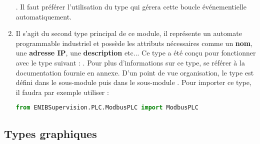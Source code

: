 \begin{enumerate}
. Il faut préférer l'utilisation du type  qui gérera cette boucle événementielle automatiquement.

\item \label{tag-presentation-ModbusPLC}  \newline
Il s'agit du second type principal de ce module, il représente un automate programmable industriel et possède les attributs nécessaires comme un \textbf{nom}, une \textbf{adresse IP}, une \textbf{description} etc... Ce type a été conçu pour fonctionner avec le type suivant : .\newline
Pour plus d'informations sur ce type, se référer à la documentation fournie en annexe.\newline
D'un point de vue organisation, le type  est défini dans le sous-module  puis dans le sous-module . \newline
Pour importer ce type, il faudra par exemple utiliser :
\begin{lstlisting}[language=Python]
from ENIBSupervision.PLC.ModbusPLC import ModbusPLC
\end{lstlisting}

\end{enumerate}



\newpage



\subsection{Types graphiques}

